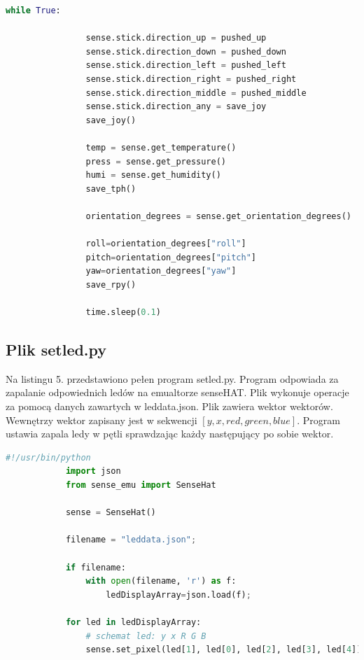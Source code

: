 \documentclass{article}
\begin{document}
			\begin{lstlisting}[caption={Pętla while programu}, language=Python, firstnumber=82]
			while True:
			
				sense.stick.direction_up = pushed_up
				sense.stick.direction_down = pushed_down
				sense.stick.direction_left = pushed_left
				sense.stick.direction_right = pushed_right
				sense.stick.direction_middle = pushed_middle
				sense.stick.direction_any = save_joy
				save_joy()
				
				temp = sense.get_temperature()
				press = sense.get_pressure()
				humi = sense.get_humidity()
				save_tph()
				
				orientation_degrees = sense.get_orientation_degrees()
				
				roll=orientation_degrees["roll"]
				pitch=orientation_degrees["pitch"]
				yaw=orientation_degrees["yaw"]
				save_rpy()
				
				time.sleep(0.1)
			\end{lstlisting} 
		\subsection{Plik setled.py}
			Na listingu 5. przedstawiono pełen program setled.py. Program odpowiada za zapalanie odpowiednich ledów na emualtorze senseHAT. Plik wykonuje operacje za pomocą danych zawartych w leddata.json. Plik zawiera wektor wektorów. Wewnętrzy wektor zapisany jest w sekwencji $[y, x, red, green, blue]$. Program ustawia zapala ledy w pętli sprawdzając każdy następujący po sobie wektor.
			\begin{lstlisting}[caption={Program setled.py}, language=Python, firstnumber=82]
			#!/usr/bin/python
			import json
			from sense_emu import SenseHat
			
			sense = SenseHat()
			
			filename = "leddata.json";
			
			if filename:
				with open(filename, 'r') as f:
					ledDisplayArray=json.load(f);
			
			for led in ledDisplayArray:
				# schemat led: y x R G B
				sense.set_pixel(led[1], led[0], led[2], led[3], led[4]);
			\end{lstlisting} 
\end{document}
